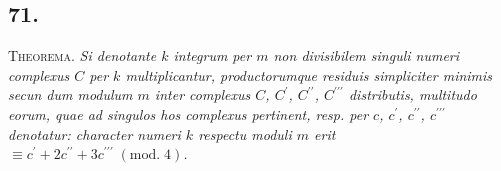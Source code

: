 \documentclass[twoside,12pt]{memoir}
\renewcommand{\pmod}[1]{\;(\textrm{mod.}\;#1)}
\begin{document}
\subsection*{71.}
 
\textsc{Theorema.} \textit{Si denotante \(k\) integrum per \(m\) non divisibilem singuli numeri complexus \(C\) per \(k\) multiplicantur, productorumque residuis simpliciter minimis secun\pagebreak%
dum modulum \(m\) inter complexus \(C\), \( C^{\prime}\), \( C^{\prime \prime}\), \( C^{\prime \prime \prime}\) distributis, multitudo eorum, quae ad singulos hos complexus pertinent, resp. per \(c\), \( c^{\prime}\), \( c^{\prime \prime}\), \( c^{\prime \prime \prime}\) denotatur: character numeri \(k\) respectu moduli \(m\) erit \(\equiv c^{\prime}+2 c^{\prime \prime}+3 c^{\prime \prime \prime}\pmod{4}\).}
\end{document}
